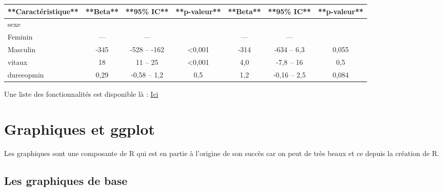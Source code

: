 \documentclass[
]{book}
\newenvironment{Shaded}{\begin{snugshade}}{\end{snugshade}}
\newcommand{\AttributeTok}[1]{\textcolor[rgb]{0.13,0.29,0.53}{#1}}
\newcommand{\FunctionTok}[1]{\textcolor[rgb]{0.13,0.29,0.53}{\textbf{#1}}}
\newcommand{\NormalTok}[1]{#1}
\newcommand{\SpecialCharTok}[1]{\textcolor[rgb]{0.81,0.36,0.00}{\textbf{#1}}}
\newcommand{\StringTok}[1]{\textcolor[rgb]{0.31,0.60,0.02}{#1}}
\begin{document}
\begin{Shaded}
\end{Shaded}

\begin{tabular}{l|c|c|c|c|c|c}
\hline
**Caractéristique** & **Beta** & **95\% IC** & **p-valeur** & **Beta** & **95\% IC** & **p-valeur**\\
\hline
sexe &  &  &  &  &  & \\
\hline
Feminin & — & — &  & — & — & \\
\hline
Masculin & -345 & -528 – -162 & <0,001 & -314 & -634 – 6,3 & 0,055\\
\hline
vitaux & 18 & 11 – 25 & <0,001 & 4,0 & -7,8 – 16 & 0,5\\
\hline
dureeopmin & 0,29 & -0,58 – 1,2 & 0,5 & 1,2 & -0,16 – 2,5 & 0,084\\
\hline
\end{tabular}

Une liste des fonctionnalités est disponible là :
\href{https://www.danieldsjoberg.com/gtsummary/reference/theme_gtsummary.html\#examples}{Ici}

\chapter{Graphiques et ggplot}\label{graphiques-et-ggplot}

Les graphiques sont une composante de R qui est en partie à l'origine de son
succès car on peut de très beaux et ce depuis la création de R.

\section{Les graphiques de base}\label{les-graphiques-de-base}
\end{document}
